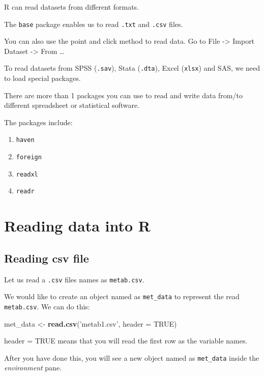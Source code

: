 \documentclass[]{book}
\newenvironment{Shaded}{\begin{snugshade}}{\end{snugshade}}
\newcommand{\KeywordTok}[1]{\textcolor[rgb]{0.13,0.29,0.53}{\textbf{#1}}}
\newcommand{\DataTypeTok}[1]{\textcolor[rgb]{0.13,0.29,0.53}{#1}}
\newcommand{\StringTok}[1]{\textcolor[rgb]{0.31,0.60,0.02}{#1}}
\newcommand{\OtherTok}[1]{\textcolor[rgb]{0.56,0.35,0.01}{#1}}
\newcommand{\NormalTok}[1]{#1}
\providecommand{\tightlist}{%
  \setlength{\itemsep}{0pt}\setlength{\parskip}{0pt}}
\theoremstyle{definition}
\theoremstyle{definition}
\theoremstyle{remark}
\begin{document}
R can read datasets from different formats.

The \texttt{base} package enables us to read \texttt{.txt} and
\texttt{.csv} files.

You can also use the point and click method to read data. Go to File
-\textgreater{} Import Dataset -\textgreater{} From \ldots{}

To read datasets from SPSS (\texttt{.sav}), Stata (\texttt{.dta}), Excel
(\texttt{xlsx}) and SAS, we need to load special packages.

There are more than 1 packages you can use to read and write data
from/to different spreadsheet or statistical software.

The packages include:

\begin{enumerate}
\def\labelenumi{\arabic{enumi}.}
\tightlist
\item
  \texttt{haven}
\item
  \texttt{foreign}
\item
  \texttt{readxl}
\item
  \texttt{readr}
\end{enumerate}

\section{Reading data into R}\label{reading-data-into-r}

\subsection{Reading csv file}\label{reading-csv-file}

Let us read a \texttt{.csv} files names as \texttt{metab.csv}.

We would like to create an object named as \texttt{met\_data} to
represent the read \texttt{metab.csv}. We can do this:

\begin{Shaded}
\begin{Highlighting}[]
\NormalTok{met_data <-}\StringTok{ }\KeywordTok{read.csv}\NormalTok{(}\StringTok{'metab1.csv'}\NormalTok{, }\DataTypeTok{header =} \OtherTok{TRUE}\NormalTok{)}
\end{Highlighting}
\end{Shaded}

header = TRUE means that you will read the first row as the variable
names.

After you have done this, you will see a new object named as
\texttt{met\_data} inside the \emph{environment} pane.
\end{document}
